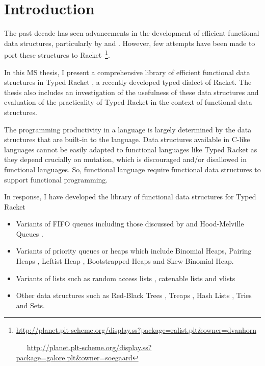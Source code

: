 \chapter{Introduction}
\label{chap:intro}



The past decade has seen advancements in the development of efficient
functional data structures, particularly by \cite{oka} and
\cite{bagwell-lists, bagwell-trie}. However, few attempts have been made
to port these structures to
Racket~\footnote{\url{http://planet.plt-scheme.org/display.ss?package=ralist.plt&owner=dvanhorn}
\par ~~~\url{http://planet.plt-scheme.org/display.ss?package=galore.plt&owner=soegaard}}.

In this MS thesis, I present a comprehensive library of efficient
functional data structures in Typed Racket \citep{thf-popl, th-diss}, a
recently developed typed dialect of Racket. The thesis also includes an
investigation of the usefulness of these data structures and evaluation
of the practicality of Typed Racket in the context of functional data
structures.

The programming productivity in a language is largely determined by the
data structures that are built-in to the language. Data structures
available in C-like languages cannot be easily adapted to functional
languages like Typed Racket as they depend crucially on mutation, which
is discouraged and/or disallowed in functional languages. So, functional
language require functional data structures to support functional
programming.

In response, I have developed the library of functional data structures
for Typed Racket

\begin{itemize}
\item
  Variants of FIFO queues including those discussed by \cite{oka} and
  Hood-Melville Queues \citep{hood-mel}.
\item
  Variants of priority queues or heaps which include Binomial Heaps,
  Pairing Heaps \citep{pairing}, Leftist Heap \citep{crane}, Bootstrapped
  Heaps \citep{oka} and Skew Binomial Heap.
\item
  Variants of lists such as random access lists \cite{oka}, catenable
  lists \citep{oka} and vlists \citep{bagwell-lists}
\item
  Other data structures such as Red-Black Trees \cite{oka-red-black},
  Treaps \citep{Seidel}, Hash Lists \citep{bagwell-lists}, Tries
  \citep{bagwell-trie} and Sets.
\end{itemize}

